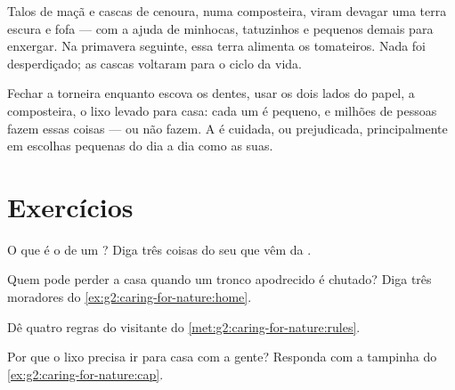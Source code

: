 \begin{example}[A composteira]\label{ex:g2:caring-for-nature:compost}
Talos de maçã e cascas de cenoura, numa composteira, viram devagar
uma terra escura e fofa --- com a ajuda de minhocas, tatuzinhos e
 pequenos demais para enxergar. Na primavera seguinte,
essa terra alimenta os tomateiros. Nada foi desperdiçado; as cascas
voltaram para o ciclo da vida.
\end{example}

\begin{remark}\label{rem:g2:caring-for-nature:count}
Fechar a torneira enquanto escova os dentes, usar os dois lados do
papel, a composteira, o lixo levado para casa: cada um é pequeno, e
milhões de pessoas fazem essas coisas --- ou não fazem. A  é
cuidada, ou prejudicada, principalmente em escolhas pequenas do dia
a dia como as suas.
\end{remark}

\section{Exercícios}

\begin{exercise}[$\star$]\label{exo:g2:caring-for-nature:1}
O que é o  de um ? Diga três coisas do seu 
que vêm da .
\end{exercise}

\begin{exercise}[$\star$]\label{exo:g2:caring-for-nature:2}
Quem pode perder a casa quando um tronco apodrecido é chutado? Diga
três moradores do \cref{ex:g2:caring-for-nature:home}.
\end{exercise}

\begin{exercise}[$\star$]\label{exo:g2:caring-for-nature:3}
Dê quatro regras do visitante do \cref{met:g2:caring-for-nature:rules}.
\end{exercise}

\begin{exercise}[$\star$]\label{exo:g2:caring-for-nature:4}
Por que o lixo precisa ir para casa com a gente? Responda com a
tampinha do \cref{ex:g2:caring-for-nature:cap}.
\end{exercise}

